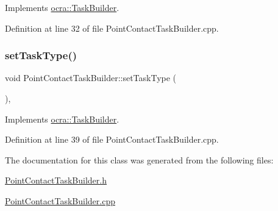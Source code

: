 Implements \hyperlink{classocra_1_1TaskBuilder_a7b44bfa101566ea4400e2d9bfdb9ff32}{ocra\+::\+Task\+Builder}.



Definition at line 32 of file Point\+Contact\+Task\+Builder.\+cpp.

\hypertarget{classocra_1_1PointContactTaskBuilder_a88d7c619f00708c1b3472ee7dc373f96}{}\label{classocra_1_1PointContactTaskBuilder_a88d7c619f00708c1b3472ee7dc373f96} 
\subsubsection{\texorpdfstring{set\+Task\+Type()}{setTaskType()}}
{\footnotesize\ttfamily void Point\+Contact\+Task\+Builder\+::set\+Task\+Type (\begin{DoxyParamCaption}{ }\end{DoxyParamCaption})\hspace{0.3cm}{\ttfamily [protected]}, {\ttfamily [virtual]}}



Implements \hyperlink{classocra_1_1TaskBuilder_a1a979fc495be6dc30483aa8fd0ff2650}{ocra\+::\+Task\+Builder}.



Definition at line 39 of file Point\+Contact\+Task\+Builder.\+cpp.



The documentation for this class was generated from the following files\+:\begin{DoxyCompactItemize}
\item 
\hyperlink{PointContactTaskBuilder_8h}{Point\+Contact\+Task\+Builder.\+h}\item 
\hyperlink{PointContactTaskBuilder_8cpp}{Point\+Contact\+Task\+Builder.\+cpp}\end{DoxyCompactItemize}
